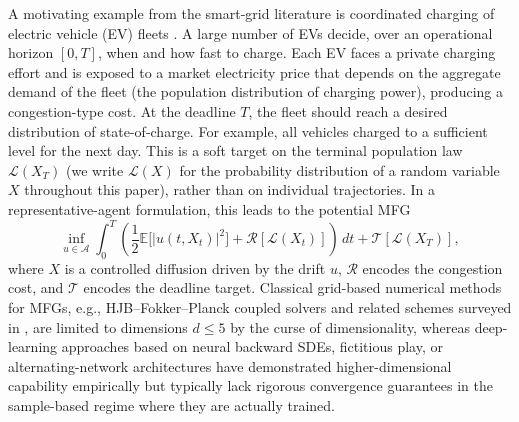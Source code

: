 \documentclass[11pt,leqno]{article}
\theoremstyle{plain}
\theoremstyle{remark}
\theoremstyle{definition}
\numberwithin{equation}{section}
\numberwithin{figure}{section}
\numberwithin{table}{section}
\numberwithin{algorithm}{section}
\newcommand{\EE}{\mathbb{E}}
\begin{document}
A motivating example from the smart-grid literature is coordinated charging of electric vehicle (EV) fleets \cite{cou-per-tem-deb:2012}.
A large number of EVs decide, over an operational horizon $[0,T]$,
when and how fast to charge.
Each EV faces a private charging effort and is exposed to a market electricity price
that depends on the aggregate demand of the fleet (the population distribution of charging power),
producing a congestion-type cost.
At the deadline $T$, the fleet should reach a desired distribution of state-of-charge.
For example, all vehicles charged to a sufficient level for the next day.
This is a soft target on the terminal population law
$\mathcal{L}(X_T)$ (we write $\mathcal{L}(X)$ for the probability distribution of a random variable $X$ throughout this paper),
rather than on individual trajectories.
In a representative-agent formulation,
this leads to the potential MFG
\begin{equation}\label{eq:1.mfg_intro}
 \inf_{u\in\mathcal{A}} 
 \int_0^T \left(\frac{1}{2}\EE\bigl[|u(t,X_t)|^2\bigr] + \mathcal{R}[\mathcal{L}(X_t)]\right)\,dt
 + \mathcal{T}[\mathcal{L}(X_T)],
\end{equation}
where $X$ is a controlled diffusion driven by the drift $u$,
$\mathcal{R}$ encodes the congestion cost,
and $\mathcal{T}$ encodes the deadline target.
Classical grid-based numerical methods for MFGs, e.g., HJB--Fokker--Planck coupled solvers
\cite{ach-cap:2010,ach-cam-cap:2012} and related schemes surveyed in \cite{lau:2021}, are limited to dimensions $d\le 5$ by the curse of dimensionality,
whereas deep-learning approaches based on neural backward SDEs, fictitious play, or alternating-network architectures
\cite{de-etal:2021,car-lau:2022,rut-etal:2020,lin-etal:2021apac}
have demonstrated higher-dimensional capability empirically
but typically lack rigorous convergence guarantees in the sample-based regime where they are actually trained.
\end{document}
